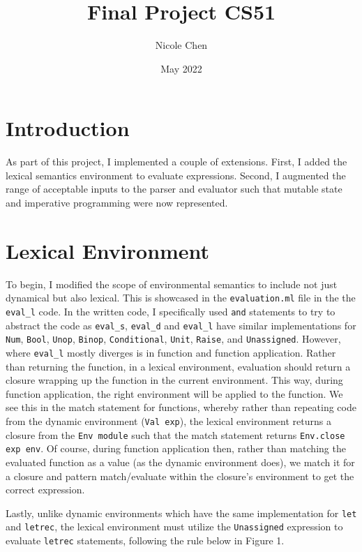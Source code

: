 \documentclass{article}
\title{Final Project CS51}
\author{Nicole Chen }
\date{May 2022}
\def\code#1{\texttt{#1}}
\begin{document}
\graphicspath{ {./images/} }

\maketitle

\section{Introduction}
As part of this project, I implemented a couple of extensions. First, I added the lexical semantics environment to evaluate expressions. Second, I augmented the range of acceptable inputs to the parser and evaluator such that mutable state and imperative programming were now represented.

\section{Lexical Environment}
To begin, I modified the scope of environmental semantics to include not just dynamical but also lexical. This is showcased in the \code{evaluation.ml} file in the the \code{eval\_l} code. In the written code, I specifically used \code{and} statements to try to abstract the code as \code{eval\_s}, \code{eval\_d} and \code{eval\_l} have similar implementations for \code{Num}, \code{Bool}, \code{Unop}, \code{Binop}, \code{Conditional}, \code{Unit}, \code{Raise}, and \code{Unassigned}. However, where \code{eval\_l} mostly diverges is in function and function application. Rather than returning the function, in a lexical environment, evaluation should return a closure wrapping up the function in the current environment. This way, during function application, the right environment will be applied to the function. We see this in the match statement for functions, whereby rather than repeating code from the dynamic environment (\code{Val exp}), the lexical environment returns a closure from the \code{Env module} such that the match statement returns \code{Env.close exp env}. Of course, during function application then, rather than matching the evaluated function as a value (as the dynamic environment does), we match it for a closure and pattern match/evaluate within the closure's environment to get the correct expression. 

Lastly, unlike dynamic environments which have the same implementation for \code{let} and \code{letrec}, the lexical environment must utilize the \code{Unassigned} expression to evaluate \code{letrec} statements, following the rule below in Figure 1.
\end{document}
